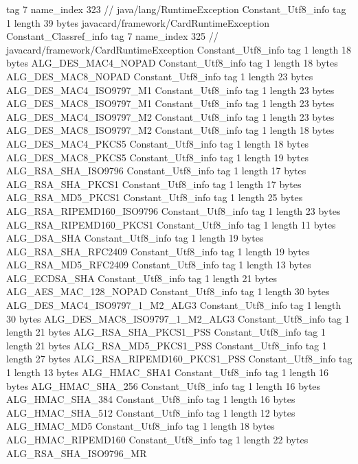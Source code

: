 {{{			tag	7
			name_index	323		// java/lang/RuntimeException
		}
		Constant_Utf8_info {
			tag	1
			length	39
			bytes	javacard/framework/CardRuntimeException
		}
		Constant_Classref_info {
			tag	7
			name_index	325		// javacard/framework/CardRuntimeException
		}
		Constant_Utf8_info {
			tag	1
			length	18
			bytes	ALG_DES_MAC4_NOPAD
		}
		Constant_Utf8_info {
			tag	1
			length	18
			bytes	ALG_DES_MAC8_NOPAD
		}
		Constant_Utf8_info {
			tag	1
			length	23
			bytes	ALG_DES_MAC4_ISO9797_M1
		}
		Constant_Utf8_info {
			tag	1
			length	23
			bytes	ALG_DES_MAC8_ISO9797_M1
		}
		Constant_Utf8_info {
			tag	1
			length	23
			bytes	ALG_DES_MAC4_ISO9797_M2
		}
		Constant_Utf8_info {
			tag	1
			length	23
			bytes	ALG_DES_MAC8_ISO9797_M2
		}
		Constant_Utf8_info {
			tag	1
			length	18
			bytes	ALG_DES_MAC4_PKCS5
		}
		Constant_Utf8_info {
			tag	1
			length	18
			bytes	ALG_DES_MAC8_PKCS5
		}
		Constant_Utf8_info {
			tag	1
			length	19
			bytes	ALG_RSA_SHA_ISO9796
		}
		Constant_Utf8_info {
			tag	1
			length	17
			bytes	ALG_RSA_SHA_PKCS1
		}
		Constant_Utf8_info {
			tag	1
			length	17
			bytes	ALG_RSA_MD5_PKCS1
		}
		Constant_Utf8_info {
			tag	1
			length	25
			bytes	ALG_RSA_RIPEMD160_ISO9796
		}
		Constant_Utf8_info {
			tag	1
			length	23
			bytes	ALG_RSA_RIPEMD160_PKCS1
		}
		Constant_Utf8_info {
			tag	1
			length	11
			bytes	ALG_DSA_SHA
		}
		Constant_Utf8_info {
			tag	1
			length	19
			bytes	ALG_RSA_SHA_RFC2409
		}
		Constant_Utf8_info {
			tag	1
			length	19
			bytes	ALG_RSA_MD5_RFC2409
		}
		Constant_Utf8_info {
			tag	1
			length	13
			bytes	ALG_ECDSA_SHA
		}
		Constant_Utf8_info {
			tag	1
			length	21
			bytes	ALG_AES_MAC_128_NOPAD
		}
		Constant_Utf8_info {
			tag	1
			length	30
			bytes	ALG_DES_MAC4_ISO9797_1_M2_ALG3
		}
		Constant_Utf8_info {
			tag	1
			length	30
			bytes	ALG_DES_MAC8_ISO9797_1_M2_ALG3
		}
		Constant_Utf8_info {
			tag	1
			length	21
			bytes	ALG_RSA_SHA_PKCS1_PSS
		}
		Constant_Utf8_info {
			tag	1
			length	21
			bytes	ALG_RSA_MD5_PKCS1_PSS
		}
		Constant_Utf8_info {
			tag	1
			length	27
			bytes	ALG_RSA_RIPEMD160_PKCS1_PSS
		}
		Constant_Utf8_info {
			tag	1
			length	13
			bytes	ALG_HMAC_SHA1
		}
		Constant_Utf8_info {
			tag	1
			length	16
			bytes	ALG_HMAC_SHA_256
		}
		Constant_Utf8_info {
			tag	1
			length	16
			bytes	ALG_HMAC_SHA_384
		}
		Constant_Utf8_info {
			tag	1
			length	16
			bytes	ALG_HMAC_SHA_512
		}
		Constant_Utf8_info {
			tag	1
			length	12
			bytes	ALG_HMAC_MD5
		}
		Constant_Utf8_info {
			tag	1
			length	18
			bytes	ALG_HMAC_RIPEMD160
		}
		Constant_Utf8_info {
			tag	1
			length	22
			bytes	ALG_RSA_SHA_ISO9796_MR
}}}
